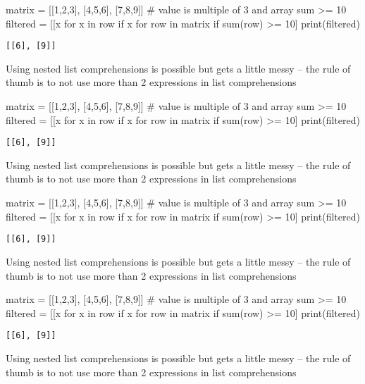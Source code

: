 \begin{python}
matrix = [[1,2,3], [4,5,6], [7,8,9]]
# value is multiple of 3 and array sum >= 10
filtered = [[x for x in row if x %
            for row in matrix if sum(row) >= 10]
print(filtered)
\end{python}
\begin{lstlisting}[style=pyOutStyle]
[[6], [9]]
\end{lstlisting}
\begin{markdown}
Using nested list comprehensions is possible but gets a little messy -- the rule of thumb is to not use more than 2 expressions in list comprehensions
\end{markdown}
\begin{python}
matrix = [[1,2,3], [4,5,6], [7,8,9]]
# value is multiple of 3 and array sum >= 10
filtered = [[x for x in row if x %
            for row in matrix if sum(row) >= 10]
print(filtered)
\end{python}
\begin{lstlisting}[style=pyOutStyle]
[[6], [9]]
\end{lstlisting}
\begin{markdown}
Using nested list comprehensions is possible but gets a little messy -- the rule of thumb is to not use more than 2 expressions in list comprehensions
\end{markdown}
\begin{python}
matrix = [[1,2,3], [4,5,6], [7,8,9]]
# value is multiple of 3 and array sum >= 10
filtered = [[x for x in row if x %
            for row in matrix if sum(row) >= 10]
print(filtered)
\end{python}
\begin{lstlisting}[style=pyOutStyle]
[[6], [9]]
\end{lstlisting}
\begin{markdown}
Using nested list comprehensions is possible but gets a little messy -- the rule of thumb is to not use more than 2 expressions in list comprehensions
\end{markdown}
\begin{python}
matrix = [[1,2,3], [4,5,6], [7,8,9]]
# value is multiple of 3 and array sum >= 10
filtered = [[x for x in row if x %
            for row in matrix if sum(row) >= 10]
print(filtered)
\end{python}
\begin{lstlisting}[style=pyOutStyle]
[[6], [9]]
\end{lstlisting}
\begin{markdown}
Using nested list comprehensions is possible but gets a little messy -- the rule of thumb is to not use more than 2 expressions in list comprehensions
\end{markdown}

